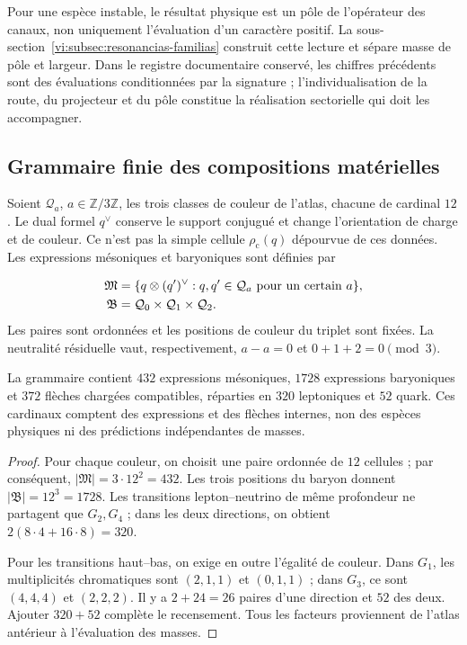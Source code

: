 Pour une espèce instable, le résultat physique est un pôle de l’opérateur
des canaux, non uniquement l’évaluation d’un caractère positif. La
sous-section~\ref{vi:subsec:resonancias-familias} construit cette lecture et
sépare masse de pôle et largeur. Dans le registre documentaire conservé,
les chiffres précédents sont des évaluations conditionnées par la signature ;
l’individualisation de la route, du projecteur et du pôle constitue la réalisation
sectorielle qui doit les accompagner.


\subsection{Grammaire finie des compositions matérielles
}
\label{vi:subsec:gramatica-compuestos}

Soient \(\mathcal Q_a\), \(a\in\mathbb Z/3\mathbb Z\), les trois
classes de couleur de l’atlas, chacune de cardinal \(12\). Le dual formel
\(q^\vee\) conserve le support conjugué et change l’orientation de
charge et de couleur. Ce n’est pas la simple cellule \(\rho_{\mathrm c}(q)\) dépourvue
de ces données. Les expressions mésoniques et baryoniques sont définies par

\begin{align}
 \mathfrak M&=\{q\otimes(q')^\vee:
 q,q'\in\mathcal Q_a\text{ pour un certain }a\},\notag\\
 \mathfrak B&=\mathcal Q_0\times\mathcal Q_1\times\mathcal Q_2.
 \label{vi:eq:gramatica-meson-barion}
\end{align}
Les paires sont ordonnées et les positions de couleur du triplet sont
fixées. La neutralité résiduelle vaut, respectivement,
\(a-a=0\) et \(0+1+2=0\pmod3\).


\begin{proposition}
\label{vi:prop:censo-compuestos}
La grammaire contient \(432\) expressions mésoniques, \(1728\)
expressions baryoniques et \(372\) flèches chargées compatibles, réparties
en \(320\) leptoniques et \(52\) quark. Ces cardinaux comptent
des expressions et des flèches internes, non des espèces physiques ni des prédictions
indépendantes de masses.

\end{proposition}
\begin{proof}
Pour chaque couleur, on choisit une paire ordonnée de \(12\) cellules ; par conséquent,
\(|\mathfrak M|=3\cdot12^2=432\). Les trois positions du baryon donnent
\(|\mathfrak B|=12^3=1728\). Les transitions lepton--neutrino de
même profondeur ne partagent que \(G_2,G_4\) ; dans les deux directions, on
obtient \(2(8\cdot4+16\cdot8)=320\).


Pour les transitions haut--bas, on exige en outre l’égalité de couleur.
Dans \(G_1\), les multiplicités chromatiques sont \((2,1,1)\) et
\((0,1,1)\) ; dans \(G_3\), ce sont \((4,4,4)\) et \((2,2,2)\).
Il y a \(2+24=26\) paires d’une direction et \(52\) des deux. Ajouter
\(320+52\) complète le recensement. Tous les facteurs proviennent de l’atlas
antérieur à l’évaluation des masses.

\end{proof}

